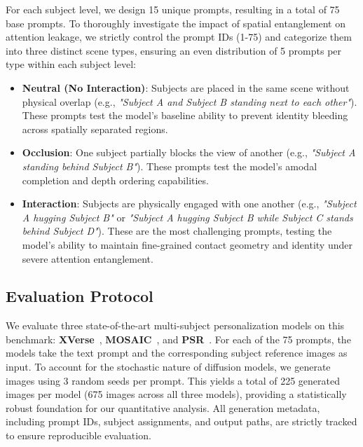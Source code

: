 For each subject level, we design 15 unique prompts, resulting in a total of 75 base prompts. To thoroughly investigate the impact of spatial entanglement on attention leakage, we strictly control the prompt IDs (1-75) and categorize them into three distinct scene types, ensuring an even distribution of 5 prompts per type within each subject level:
\begin{itemize}
    \item \textbf{Neutral (No Interaction)}: Subjects are placed in the same scene without physical overlap (e.g., \textit{"Subject A and Subject B standing next to each other"}). These prompts test the model's baseline ability to prevent identity bleeding across spatially separated regions.
    \item \textbf{Occlusion}: One subject partially blocks the view of another (e.g., \textit{"Subject A standing behind Subject B"}). These prompts test the model's amodal completion and depth ordering capabilities.
    \item \textbf{Interaction}: Subjects are physically engaged with one another (e.g., \textit{"Subject A hugging Subject B"} or \textit{"Subject A hugging Subject B while Subject C stands behind Subject D"}). These are the most challenging prompts, testing the model's ability to maintain fine-grained contact geometry and identity under severe attention entanglement.
\end{itemize}

\subsection{Evaluation Protocol}
We evaluate three state-of-the-art multi-subject personalization models on this benchmark: \textbf{XVerse}~\cite{xverse2024}, \textbf{MOSAIC}~\cite{mosaic2024}, and \textbf{PSR}~\cite{psr2024}. For each of the 75 prompts, the models take the text prompt and the corresponding subject reference images as input. To account for the stochastic nature of diffusion models, we generate images using 3 random seeds per prompt. This yields a total of 225 generated images per model (675 images across all three models), providing a statistically robust foundation for our quantitative analysis. All generation metadata, including prompt IDs, subject assignments, and output paths, are strictly tracked to ensure reproducible evaluation.
